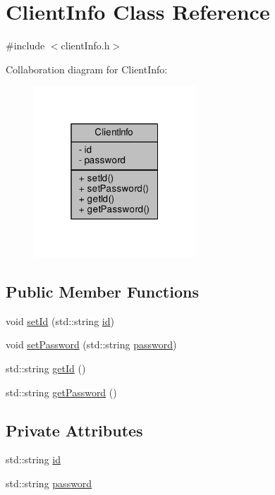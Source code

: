 \hypertarget{class_client_info}{}\section{Client\+Info Class Reference}
\label{class_client_info}


{\ttfamily \#include $<$client\+Info.\+h$>$}



Collaboration diagram for Client\+Info\+:
\nopagebreak
\begin{figure}[H]
\begin{center}
\leavevmode
\includegraphics[width=172pt]{class_client_info__coll__graph}
\end{center}
\end{figure}
\subsection*{Public Member Functions}
\begin{DoxyCompactItemize}
\item 
void \hyperlink{class_client_info_a7107653a07f6bbe1ce06befafcb36463}{set\+Id} (std\+::string \hyperlink{class_client_info_a68ab63d60cc31e1a6cbb7681af5cd053}{id})
\item 
void \hyperlink{class_client_info_a08270293bc6cab79a4a486880e73e072}{set\+Password} (std\+::string \hyperlink{class_client_info_aef7d99a8255d74631611bee45d401d85}{password})
\item 
std\+::string \hyperlink{class_client_info_a55ac97ddc9f3e2d2719614c07f71e3af}{get\+Id} ()
\item 
std\+::string \hyperlink{class_client_info_a513532bdc9245093e1f62abba5ca9f35}{get\+Password} ()
\end{DoxyCompactItemize}
\subsection*{Private Attributes}
\begin{DoxyCompactItemize}
\item 
std\+::string \hyperlink{class_client_info_a68ab63d60cc31e1a6cbb7681af5cd053}{id}
\item 
std\+::string \hyperlink{class_client_info_aef7d99a8255d74631611bee45d401d85}{password}
\end{DoxyCompactItemize}


